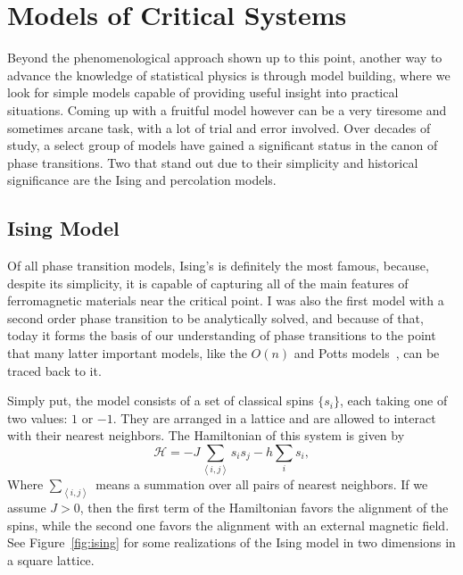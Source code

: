 \section{Models of Critical Systems}
\label{sec:models}

Beyond the phenomenological approach shown up to this point, another way to
advance the knowledge of statistical physics is through model building, where
we look for simple models capable of providing useful insight into practical
situations. Coming up with a fruitful model however can be a very tiresome and
sometimes arcane task, with a lot of trial and error involved. Over decades of
study, a select group of models have gained a significant status in the canon
of phase transitions. Two that stand out due to their simplicity and historical
significance are the Ising and percolation models.


\subsection{Ising Model}
\label{sec:ising}

Of all phase transition models, Ising's is definitely the most famous, because,
despite its simplicity, it is capable of capturing all of the main features of
ferromagnetic materials near the critical point. I was also the first model
with a second order phase transition to be analytically solved, and because of
that, today it forms the basis of our understanding of phase transitions to
the point that many latter important models, like the $O(n)$ and Potts
models~\cite{Wu1982}, can be traced back to it.

Simply put, the model consists of a set of classical spins $\{s_i\}$, each
taking one of two values: $1$ or $-1$. They are arranged in a lattice and are
allowed to interact with their nearest neighbors. The Hamiltonian of this
system is given by
\begin{equation}
    \mathcal{H}=
    -J\sum_{\left\langle i,j\right\rangle }s_{i}s_{j}
    -h\sum_{i}s_{i},
\end{equation}
Where $\sum_{\left\langle i,j\right\rangle}$ means a summation over all pairs
of nearest neighbors. If we assume $J>0$, then the first term of the
Hamiltonian favors the alignment of the spins, while the second one favors the
alignment with an external magnetic field. See Figure~\ref{fig:ising} for some
realizations of the Ising model in two dimensions in a square lattice.

